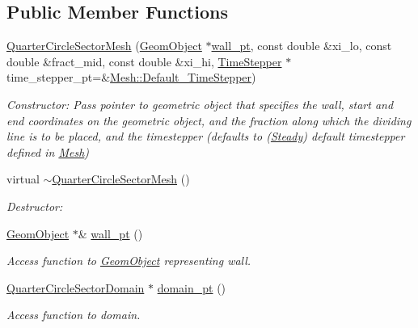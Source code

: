 \subsection*{Public Member Functions}
\begin{DoxyCompactItemize}
\item 
\hyperlink{classoomph_1_1QuarterCircleSectorMesh_a3fbcc7dd28aefc3dddda607785695afc}{Quarter\+Circle\+Sector\+Mesh} (\hyperlink{classoomph_1_1GeomObject}{Geom\+Object} $\ast$\hyperlink{classoomph_1_1QuarterCircleSectorMesh_a0b03071bbe7e95cc6723c221ddc0998a}{wall\+\_\+pt}, const double \&xi\+\_\+lo, const double \&fract\+\_\+mid, const double \&xi\+\_\+hi, \hyperlink{classoomph_1_1TimeStepper}{Time\+Stepper} $\ast$time\+\_\+stepper\+\_\+pt=\&\hyperlink{classoomph_1_1Mesh_a12243d0fee2b1fcee729ee5a4777ea10}{Mesh\+::\+Default\+\_\+\+Time\+Stepper})
\begin{DoxyCompactList}\small\item\em Constructor\+: Pass pointer to geometric object that specifies the wall, start and end coordinates on the geometric object, and the fraction along which the dividing line is to be placed, and the timestepper (defaults to (\hyperlink{classoomph_1_1Steady}{Steady}) default timestepper defined in \hyperlink{classoomph_1_1Mesh}{Mesh}) \end{DoxyCompactList}\item 
virtual \hyperlink{classoomph_1_1QuarterCircleSectorMesh_af3aec899bd005cacb011c13bcb6e5f22}{$\sim$\+Quarter\+Circle\+Sector\+Mesh} ()
\begin{DoxyCompactList}\small\item\em Destructor\+: \end{DoxyCompactList}\item 
\hyperlink{classoomph_1_1GeomObject}{Geom\+Object} $\ast$\& \hyperlink{classoomph_1_1QuarterCircleSectorMesh_a0b03071bbe7e95cc6723c221ddc0998a}{wall\+\_\+pt} ()
\begin{DoxyCompactList}\small\item\em Access function to \hyperlink{classoomph_1_1GeomObject}{Geom\+Object} representing wall. \end{DoxyCompactList}\item 
\hyperlink{classoomph_1_1QuarterCircleSectorDomain}{Quarter\+Circle\+Sector\+Domain} $\ast$ \hyperlink{classoomph_1_1QuarterCircleSectorMesh_a53adafee1a15301fe99a481b641df45b}{domain\+\_\+pt} ()
\begin{DoxyCompactList}\small\item\em Access function to domain. \end{DoxyCompactList}\item 

\end{DoxyCompactItemize}
